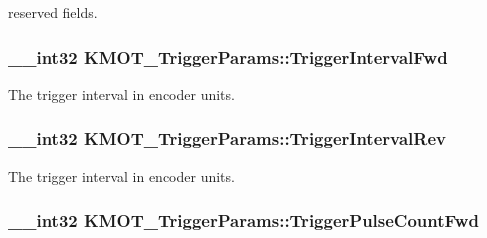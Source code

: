 reserved fields. 

\subsubsection[{\texorpdfstring{Trigger\+Interval\+Fwd}{TriggerIntervalFwd}}]{\setlength{\rightskip}{0pt plus 5cm}\+\_\+\+\_\+int32 K\+M\+O\+T\+\_\+\+Trigger\+Params\+::\+Trigger\+Interval\+Fwd}\hypertarget{struct_k_m_o_t___trigger_params_ad03bb4ac9af814270bd4625167f93c8b}{}\label{struct_k_m_o_t___trigger_params_ad03bb4ac9af814270bd4625167f93c8b}


The trigger interval in encoder units. 

\subsubsection[{\texorpdfstring{Trigger\+Interval\+Rev}{TriggerIntervalRev}}]{\setlength{\rightskip}{0pt plus 5cm}\+\_\+\+\_\+int32 K\+M\+O\+T\+\_\+\+Trigger\+Params\+::\+Trigger\+Interval\+Rev}\hypertarget{struct_k_m_o_t___trigger_params_a0a47def826b778a9df1b44a4dd1d5308}{}\label{struct_k_m_o_t___trigger_params_a0a47def826b778a9df1b44a4dd1d5308}


The trigger interval in encoder units. 

\subsubsection[{\texorpdfstring{Trigger\+Pulse\+Count\+Fwd}{TriggerPulseCountFwd}}]{\setlength{\rightskip}{0pt plus 5cm}\+\_\+\+\_\+int32 K\+M\+O\+T\+\_\+\+Trigger\+Params\+::\+Trigger\+Pulse\+Count\+Fwd}\hypertarget{struct_k_m_o_t___trigger_params_a95ca64abd5c0b10363ceacaef64d457f}{}\label{struct_k_m_o_t___trigger_params_a95ca64abd5c0b10363ceacaef64d457f}


